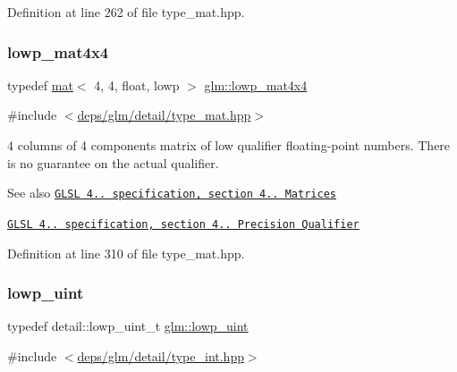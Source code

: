 Definition at line 262 of file type\+\_\+mat.\+hpp.

\mbox{\label{group__core__precision_gaf8957db9f94a9c01a63db849da81bea0}} 
\subsubsection{\texorpdfstring{lowp\+\_\+mat4x4}{lowp\_mat4x4}}
{\footnotesize\ttfamily typedef \hyperlink{structglm_1_1mat}{mat}$<$ 4, 4, float, lowp $>$ \hyperlink{group__core__precision_gaf8957db9f94a9c01a63db849da81bea0}{glm\+::lowp\+\_\+mat4x4}}



{\ttfamily \#include $<$\hyperlink{type__mat_8hpp}{deps/glm/detail/type\+\_\+mat.\+hpp}$>$}

4 columns of 4 components matrix of low qualifier floating-\/point numbers. There is no guarantee on the actual qualifier.

\begin{DoxySeeAlso}{See also}
\href{http://www.opengl.org/registry/doc/GLSLangSpec.4.20.8.pdf}{\tt G\+L\+SL 4.. specification, section 4.. Matrices} 

\href{http://www.opengl.org/registry/doc/GLSLangSpec.4.20.8.pdf}{\tt G\+L\+SL 4.. specification, section 4.. Precision Qualifier} 
\end{DoxySeeAlso}


Definition at line 310 of file type\+\_\+mat.\+hpp.

\mbox{\label{group__core__precision_ga8077c90f2c87e419ea6c273157dcc1fc}} 
\subsubsection{\texorpdfstring{lowp\+\_\+uint}{lowp\_uint}}
{\footnotesize\ttfamily typedef detail\+::lowp\+\_\+uint\+\_\+t \hyperlink{group__core__precision_ga8077c90f2c87e419ea6c273157dcc1fc}{glm\+::lowp\+\_\+uint}}



{\ttfamily \#include $<$\hyperlink{type__int_8hpp}{deps/glm/detail/type\+\_\+int.\+hpp}$>$}

